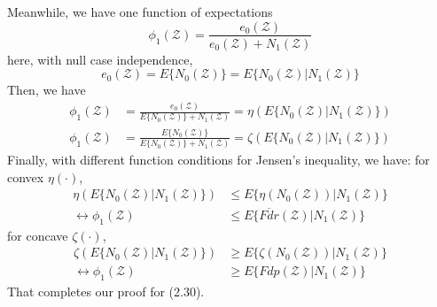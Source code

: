 \documentclass{article}\usepackage{graphicx, color}
\begin{document}
\subsubsection*{}
Meanwhile, we have one function of expectations
\begin{displaymath}
\phi_1(\mathcal{Z}) = \frac{e_0(\mathcal{Z})}{e_0(\mathcal{Z}) + N_1(\mathcal{Z})}
\end{displaymath}
here, with null case independence,
\begin{displaymath}
e_0(\mathcal{Z}) = E\{ N_0(\mathcal{Z}) \} = E\{ N_0(\mathcal{Z}) | N_1(\mathcal{Z})\}
\end{displaymath}
Then, we have
\begin{displaymath}
\begin{split}
\phi_1(\mathcal{Z}) &= \frac{e_0(\mathcal{Z})}{E\{N_0(\mathcal{Z})\} +  N_1(\mathcal{Z})} 
= \eta(E\{N_0(\mathcal{Z}) | N_1(\mathcal{Z})\}) \\
\phi_1(\mathcal{Z}) &= \frac{E\{N_0(\mathcal{Z})\}}{E\{N_0(\mathcal{Z})\} +  N_1(\mathcal{Z})} 
= \zeta(E\{N_0(\mathcal{Z}) | N_1(\mathcal{Z})\})
\end{split}
\end{displaymath}
Finally, with different function conditions for Jensen's inequality,
we have:\newline
for convex $\eta(\cdot)$,
\begin{displaymath}
\begin{split}
\eta(E\{N_0(\mathcal{Z}) | N_1(\mathcal{Z})\}) &\leq E\{\eta(N_0(\mathcal{Z})) | N_1(\mathcal{Z}) \} \\
\leftrightarrow
\phi_1(\mathcal{Z}) &\leq E\{\overline{Fdr}(\mathcal{Z}) | N_1(\mathcal{Z})\} 
\end{split}
\end{displaymath}
for concave $\zeta(\cdot)$,
\begin{displaymath}
\begin{split}
\zeta(E\{N_0(\mathcal{Z}) | N_1(\mathcal{Z})\}) &\geq E\{\zeta(N_0(\mathcal{Z})) | N_1(\mathcal{Z}) \} \\
\leftrightarrow
\phi_1(\mathcal{Z}) &\geq E\{Fdp(\mathcal{Z}) | N_1(\mathcal{Z})\} 
\end{split}
\end{displaymath}
That completes our proof for (2.30).
\end{document}
